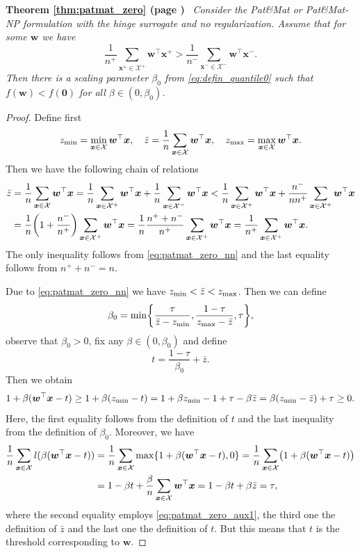 \documentclass[]{interact}
\theoremstyle{plain}%
\theoremstyle{definition}
\theoremstyle{remark}
\let\originalleft\left
\let\originalright\right
\renewcommand{\left}{\mathopen{}\mathclose\bgroup\originalleft}
\renewcommand{\right}{\aftergroup\egroup\originalright}
\newcommand{\patmat}{\emph{Pat}\&\emph{Mat}\xspace}
\newcommand{\npB}{{\emph{Pat}\&\emph{Mat-NP}}\xspace}
\newcommand{\Xcal}{\mathcal{X}}
\newcommand{\theoremNN}[2]{\noindent\textbf{Theorem \ref{#1} (page \pageref{#1})}\ \emph{#2}}
\begin{document}
\theoremNN{thm:patmat_zero}{
Consider the \patmat or \npB formulation with the hinge surrogate and no regularization. Assume that for some $\bm w$ we have
\begin{equation}\label{eq:patmat_zero_nn}
\frac{1}{n^+}\sum_{\bm x^+\in \Xcal^+}\bm w^\top \bm x^+ > \frac{1}{n^-}\sum_{\bm x^-\in \Xcal^-}\bm w^\top \bm x^-.
\end{equation}
Then there is a scaling parameter $\beta_0$ from \eqref{eq:defin_quantile0} such that $f(\bm w)<f(\bm 0)$ for all $\beta\in(0,\beta_0)$.
}
\begin{proof}
Define first
$$
\aligned
z_{\rm min} = \min_{\bm x\in \Xcal}\bm w^\top \bm x, \quad
\bar z = \frac{1}{n}\sum_{\bm x\in \Xcal}\bm w^\top \bm x , \quad
z_{\rm max} = \max_{\bm x\in \Xcal}\bm w^\top \bm x.
\endaligned
$$
Then we have the following chain of relations
\begin{equation}\label{eq:patmat_zero_aux0}
\aligned
\bar z &= \frac{1}{n}\sum_{\bm x\in\Xcal}\bm w^\top \bm x = \frac{1}{n}\sum_{\bm x\in\Xcal^+}\bm w^\top \bm x + \frac{1}{n}\sum_{\bm x\in\Xcal^-}\bm w^\top \bm x < \frac{1}{n}\sum_{\bm x\in\Xcal^+}\bm w^\top \bm x + \frac{n^-}{nn^+}\sum_{\bm x\in\Xcal^+}\bm w^\top \bm x \\
&= \frac 1n\left(1+\frac{n^-}{n^+}\right)\sum_{\bm x\in\Xcal^+}\bm w^\top \bm x = \frac 1n\frac{n^++n^-}{n^+}\sum_{\bm x\in\Xcal^+}\bm w^\top \bm x = \frac 1{n^+}\sum_{\bm x\in\Xcal^+}\bm w^\top \bm x.
\endaligned
\end{equation}
The only inequality follows from \eqref{eq:patmat_zero_nn} and the last equality follows from $n^++n^-=n$.

Due to \eqref{eq:patmat_zero_nn} we have $z_{\rm min}<\bar z<z_{\rm max}$. Then we can define
$$
\beta_0 = \min\left\{\frac{\tau}{\bar z-z_{\rm min}}, \frac{1-\tau}{z_{\rm max}-\bar z}, \tau\right\},
$$
observe that $\beta_0>0$, fix any $\beta\in(0,\beta_0)$ and define
$$
  t = \frac{1-\tau}{\beta_0} + \bar z.
$$
Then we obtain
\begin{equation}\label{eq:patmat_zero_aux1}
1+\beta(\bm w^\top\bm x-t) \ge 1+\beta(z_{\rm min}-t) = 1+\beta z_{\rm min}-1+\tau - \beta\bar z = \beta (z_{\rm min}-\bar z)+\tau\ge 0.
\end{equation}
Here, the first equality follows from the definition of $t$ and the last inequality from the definition of $\beta_0$. Moreover, we have
$$
\aligned
\frac{1}{n}\sum_{\bm x\in\Xcal}l(\beta(\bm w^\top\bm x-t)) &= \frac{1}{n}\sum_{\bm x\in\Xcal}\max\{1+\beta(\bm w^\top\bm x-t), 0\} = \frac{1}{n}\sum_{\bm x\in\Xcal}\left(1+\beta(\bm w^\top\bm x-t)\right) \\
&= 1-\beta t + \frac{\beta}{n}\sum_{\bm x\in\Xcal}\bm w^\top\bm x = 1-\beta t + \beta\bar z = \tau,
\endaligned
$$
where the second equality employs \eqref{eq:patmat_zero_aux1}, the third one the definition of $\bar z$ and the last one the definition of $t$. But this means that $t$ is the threshold corresponding to $\bm w$.


\end{proof}
\end{document}
